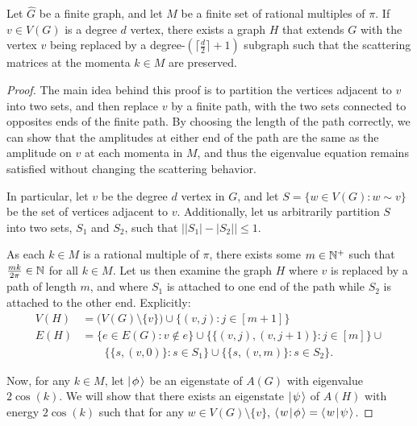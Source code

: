 \documentclass[../thesis-main/thesis-main]{subfiles}
\begin{document}
\begin{lemma} Let $\widehat{G}$ be a finite graph, and let $M$ be a finite set of rational multiples of $\pi$.  If $v\in V(G)$ is a degree $d$ vertex, there exists a graph $H$ that extends $G$ with the vertex $v$ being replaced by a degree-$(\lceil \frac{d}{2}\rceil +1)$ subgraph such that the scattering matrices at the momenta $k\in M$ are preserved.
\label{lem:degree_reduction}
\end{lemma}
\begin{proof}
  The main idea behind this proof is to partition the vertices adjacent to $v$ into two sets, and then replace $v$ by a finite path, with the two sets connected to opposites ends of the finite path.  By choosing the length of the path correctly, we can show that the amplitudes at either end of the path are the same as the amplitude on $v$ at each momenta in $M$, and thus the eigenvalue equation remains satisfied without changing the scattering behavior.  
  
  In particular, let $v$ be the degree $d$ vertex in $G$, and let $S = \{w\in V(G) : w\sim v\}$ be the set of vertices adjacent to $v$.  Additionally, let us arbitrarily partition $S$ into two sets, $S_1$ and $S_2$, such that $\big||S_1|-|S_2|\big| \leq 1$.
  
  As each $k\in M$ is a rational multiple of $\pi$, there exists some $m\in \mathbb{N}^+$ such that $\frac{mk}{2\pi} \in \mathbb{N}$ for all $k\in M$.  Let us then examine the graph $H$ where $v$ is replaced by a path of length $m$, and where $S_1$ is attached to one end of the path while $S_2$ is attached to the other end.  Explicitly:
  \begin{align}
    V(H) &= \big(V(G)\setminus \{v\}\big) \cup \{(v,j): j\in [m+1]\}\\
    E(H) &= \big\{ e\in E(G) : v\notin e\big\} \cup \big\{ \{(v,j),(v,j+1)\} : j\in [m]\big\} \cup \nonumber\\
    &\qquad \big\{ \{s, (v,0)\} : s\in S_1\big\} \cup \big\{ \{s,(v,m)\} : s\in S_2\big\}.
  \end{align}
  
  Now, for any $k\in M$, let $|\mspace{2mu} \phi \mspace{2mu} \rangle$ be an eigenstate of $A(G)$ with eigenvalue $2\cos(k)$.  We will show that there exists an eigenstate $|\mspace{2mu} \psi \mspace{2mu} \rangle$ of $A(H)$ with energy $2\cos(k)$ such that for any $w\in V(G)\setminus \{v\}$, $\langle\mspace{2mu} w \mspace{2mu} | \mspace{2mu} \phi\mspace{2mu} \rangle = \langle\mspace{2mu} w \mspace{2mu} | \mspace{2mu} \psi\mspace{2mu} \rangle$.  
  

\end{proof}
\end{document}
